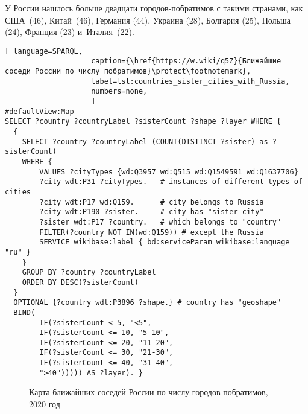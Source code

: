 У России нашлось больше двадцати городов-побратимов с такими странами, 
как США~(46), Китай~(46), Германия (44), Украина (28), Болгария (25), 
Польша (24), Франция (23) и~Италия~(22).


\begin{lstlisting}[ language=SPARQL, 
                    caption={\href{https://w.wiki/q5Z}{Ближайшие соседи России по числу побратимов}\protect\footnotemark},
                    label=lst:countries_sister_cities_with_Russia,
                    numbers=none,
                    ]
#defaultView:Map
SELECT ?country ?countryLabel ?sisterCount ?shape ?layer WHERE {
  { 
    SELECT ?country ?countryLabel (COUNT(DISTINCT ?sister) as ?sisterCount) 
    WHERE {  
        VALUES ?cityTypes {wd:Q3957 wd:Q515 wd:Q1549591 wd:Q1637706}
        ?city wdt:P31 ?cityTypes.   # instances of different types of cities
        ?city wdt:P17 wd:Q159.      # city belongs to Russia
        ?city wdt:P190 ?sister.     # city has "sister city"
        ?sister wdt:P17 ?country.   # which belongs to "country"
        FILTER(?country NOT IN(wd:Q159)) # except the Russia
        SERVICE wikibase:label { bd:serviceParam wikibase:language "ru" }
    }
    GROUP BY ?country ?countryLabel
    ORDER BY DESC(?sisterCount)
  }
  OPTIONAL {?country wdt:P3896 ?shape.} # country has "geoshape"
  BIND(
	    IF(?sisterCount < 5, "<5",
		IF(?sisterCount <= 10, "5-10",
		IF(?sisterCount <= 20, "11-20",
		IF(?sisterCount <= 30, "21-30",
		IF(?sisterCount <= 40, "31-40",
		">40"))))) AS ?layer). }
\end{lstlisting}

\begin{figure*}
{
\setlength{\fboxsep}{0pt}%
\setlength{\fboxrule}{1pt}%
}
	\caption{Карта ближайших соседей России по числу городов-побратимов,\\2020 год}
	\label{fig:Map_closest_neighbours_Russia}
\end{figure*}







